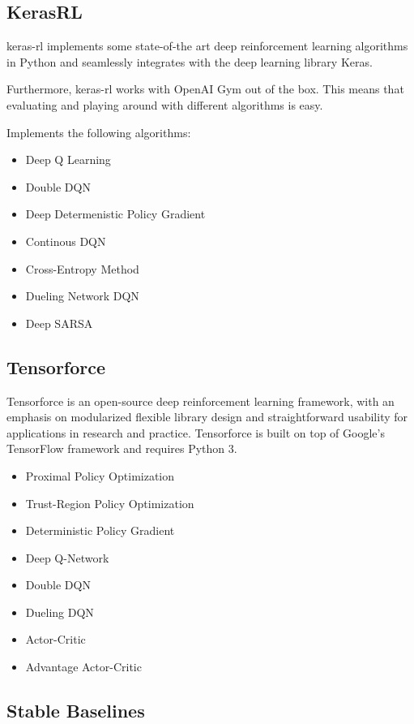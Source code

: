 \documentclass[letterpaper, 10 pt]{IEEEconf}
\begin{document}
\subsection{KerasRL~\cite{plappert2016kerasrl}}

keras-rl implements some state-of-the art deep reinforcement learning
algorithms in Python and seamlessly integrates with the deep learning
library Keras.

Furthermore, keras-rl works with OpenAI Gym out of the box. This means
that evaluating and playing around with different algorithms is easy.

Implements the following algorithms:

\begin{itemize}
	\item Deep Q Learning
	\item Double DQN
	\item Deep Determenistic Policy Gradient
	\item Continous DQN
	\item Cross-Entropy Method
	\item Dueling Network DQN
	\item Deep SARSA
\end{itemize}

\subsection{Tensorforce~\cite{tensorforce}}

Tensorforce is an open-source deep reinforcement
learning framework, with an emphasis on modularized flexible library
design and straightforward usability for applications in research and
practice. Tensorforce is built on top of Google's TensorFlow framework
and requires Python 3.

\begin{itemize}
	\item Proximal Policy Optimization
	\item Trust-Region Policy Optimization
	\item Deterministic Policy Gradient
	\item Deep Q-Network
	\item Double DQN
	\item Dueling DQN
	\item Actor-Critic
	\item Advantage Actor-Critic
\end{itemize}

\subsection{Stable Baselines~\cite{stable-baselines}}
\end{document}
